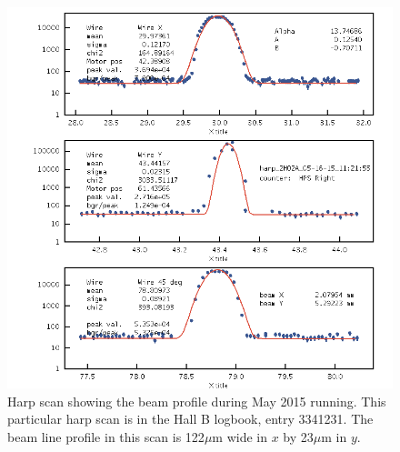 
\begin{figure}[hbt]
\begin{minipage}{0.65\textwidth}
\includegraphics[width=\textwidth]{pics/experiment/harpScan.png}
\end{minipage}\hfill\begin{minipage}{0.32\textwidth}
\caption[Beam profile from harp scan during 2015 run]{ \label{fig:harpScan} \baselineskip 11pt
Harp scan showing the beam profile during May 2015 running. This particular harp scan is in the Hall B logbook, entry 3341231. The beam line profile in this scan is 122$\mu$m wide in $x$ by 23$\mu$m in $y$.}
\end{minipage}
\end{figure}


